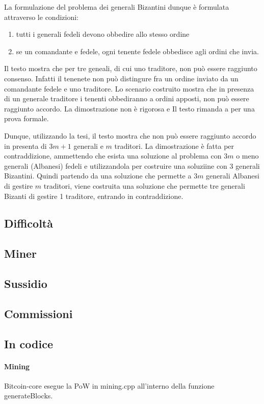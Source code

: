 \documentclass{book}
\theoremstyle{definition}
\begin{document}
La formulazione del problema dei generali Bizantini dunque è formulata attraverso le condizioni:

\begin{enumerate}[label=(IC\arabic*),itemindent=*]
    \item tutti i generali fedeli devono obbedire allo stesso ordine
    \item se un comandante e fedele, ogni tenente fedele obbedisce agli ordini che invia.
\end{enumerate}

Il testo mostra che per tre geneali, di cui uno traditore, non può essere raggiunto consenso.
Infatti il tenenete non può distingure fra un ordine inviato da un comandante fedele e uno traditore.
Lo scenario costruito mostra che in presenza di un generale traditore i tenenti obbediranno a ordini apposti, 
non può essere raggiunto accordo. La dimostrazione non è rigorosa e Il testo rimanda a \cite{Pease1980ReachingAI} per una prova formale.

Dunque, utilizzando la tesi, il testo mostra che non può essere raggiunto accordo in presenta di $3m +1$ generali e $m$ traditori.
La dimostrazione è fatta per contraddizione, ammettendo che esista una soluzione al problema con $3m$ o meno generali (Albanesi) fedeli e utilizzandola per costruire una soluziine con 
3 generali Bizantini.
Quindi partendo da una soluzione che permette a $3m$ generali Albanesi di gestire $m$ traditori, viene costruita una soluzione che permette tre generali Bizanti di gestire 1 traditore, entrando in contraddizione.
\subsection{Difficoltà}
\subsection{Miner}
\subsection{Sussidio}
\subsection{Commissioni}
\subsection{In codice}

\paragraph{Mining}
Bitcoin-core esegue la PoW in mining.cpp all'interno della funzione generateBlocks.
\end{document}
